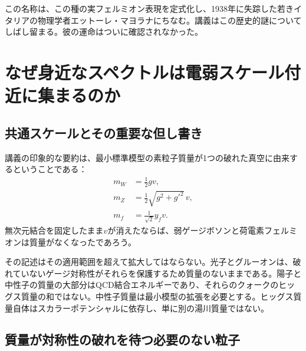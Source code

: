 この名称は、この種の実フェルミオン表現を定式化し、1938年に失踪した若きイタリアの物理学者エットーレ・マヨラナにちなむ。講義はこの歴史的謎についてしばし留まる。彼の運命はついに確認されなかった。

\section{なぜ身近なスペクトルは電弱スケール付近に集まるのか}

\subsection{共通スケールとその重要な但し書き}

\begin{classroomqa}
\end{classroomqa}

講義の印象的な要約は、最小標準模型の素粒子質量が1つの破れた真空に由来するということである：
\begin{align}
  m_W&=\frac12gv,\\
  m_Z&=\frac12\sqrt{g^2+g'^2}\,v,\\
  m_f&=\frac1{\sqrt2}y_fv.
  \label{eq:l09-electroweak-mass-summary}
\end{align}
無次元結合を固定したまま\(v\)が消えたならば、弱ゲージボソンと荷電素フェルミオンは質量がなくなったであろう。

その記述はその適用範囲を超えて拡大してはならない。光子とグルーオンは、破れていないゲージ対称性がそれらを保護するため質量のないままである。陽子と中性子の質量の大部分はQCD結合エネルギーであり、それらのクォークのヒッグス質量の和ではない。中性子質量は最小模型の拡張を必要とする。ヒッグス質量自体はスカラーポテンシャルに依存し、単に別の湯川質量ではない。

\subsection{質量が対称性の破れを待つ必要のない粒子}

